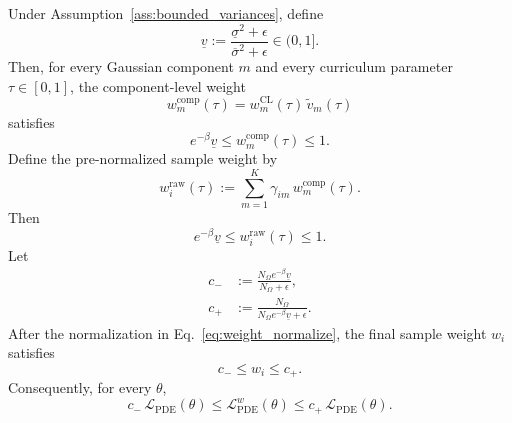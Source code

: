 \documentclass[10pt,a4paper]{amsart}
\begin{document}
\begin{theorem}
	\label{thm:weight_equiv}
	Under Assumption~\ref{ass:bounded_variances}, define
	\begin{equation}
		\underline{v}
		:=
		\frac{\underline{\sigma}^{2}+\epsilon}
		{\overline{\sigma}^{2}+\epsilon}
		\in(0,1].
		\label{eq:app_v_under}
	\end{equation}
	Then, for every Gaussian component $m$ and every curriculum parameter
	$\tau\in[0,1]$, the component-level weight
	\begin{equation}
		w_m^{\mathrm{comp}}(\tau)
		=
		w_m^{\mathrm{CL}}(\tau)\,\tilde v_m(\tau)
		\label{eq:app_component_weight}
	\end{equation}
	satisfies
	\begin{equation}
		e^{-\beta}\underline{v}
		\leqslant
		w_m^{\mathrm{comp}}(\tau)
		\leqslant
		1.
		\label{eq:app_component_weight_bound}
	\end{equation}
	Define the pre-normalized sample weight by
	\begin{equation}
		w_i^{\mathrm{raw}}(\tau)
		:=
		\sum_{m=1}^{K}\gamma_{im}\,w_m^{\mathrm{comp}}(\tau).
		\label{eq:app_raw_weight}
	\end{equation}
	Then
	\begin{equation}
		e^{-\beta}\underline{v}
		\leqslant
		w_i^{\mathrm{raw}}(\tau)
		\leqslant
		1.
		\label{eq:app_raw_weight_bound}
	\end{equation}
	Let
	\begin{equation}
		\begin{aligned}
			c_- &:= \frac{N_{\Omega}e^{-\beta}\underline{v}}{N_{\Omega}+\epsilon},\\
			c_+ &:= \frac{N_{\Omega}}{N_{\Omega}e^{-\beta}\underline{v}+\epsilon}.
		\end{aligned}
		\label{eq:app_weight_constants}
	\end{equation}
	After the normalization in Eq.~\eqref{eq:weight_normalize}, the final
	sample weight $w_i$ satisfies
	\begin{equation}
		c_- \leqslant w_i \leqslant c_+.
		\label{eq:app_final_weight_bound}
	\end{equation}
	Consequently, for every $\theta$,
	\begin{equation}
		c_-\,
		\mathcal{L}_{\mathrm{PDE}}(\theta)
		\leqslant
		\mathcal{L}_{\mathrm{PDE}}^{w}(\theta)
		\leqslant
		c_+\,
		\mathcal{L}_{\mathrm{PDE}}(\theta).
		\label{eq:app_loss_equivalence}
	\end{equation}
\end{theorem}
\end{document}
